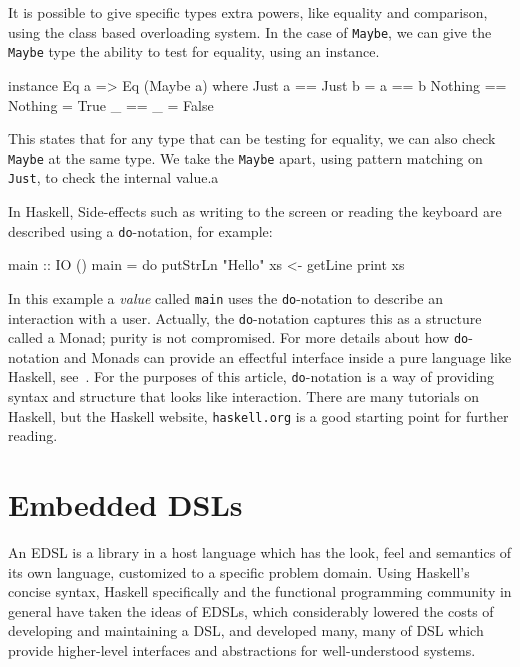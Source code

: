 \documentclass[11pt]{article}
\begin{document}
It is possible to give specific types extra powers, like equality and comparison,
using the class based overloading system. In the case of \verb|Maybe|, we
can give the \verb|Maybe| type the ability to test for equality, using an
instance.
\begin{Code}
instance Eq a => Eq (Maybe a) where        
   Just a  == Just b  = a == b
   Nothing == Nothing = True
   \_       == \_       = False
\end{Code}

This states that for any type that can be testing for equality,
we can also check \verb|Maybe| at the same type. We take the \verb|Maybe|
apart, using pattern matching on \verb|Just|, to check the internal value.a

In Haskell, Side-effects such as writing to the screen
or reading the keyboard are described using a \verb|do|-notation, for example:

\begin{Code}

main :: IO ()
main = do
  putStrLn "Hello"
  xs <- getLine
  print xs

\end{Code}

In this example a {\em value\/} called \verb|main| uses the \verb|do|-notation to describe
an interaction with a user. Actually, the \verb|do|-notation captures
this as a structure called a Monad; purity is not compromised. For more details
about how \verb|do|-notation and Monads can provide an effectful interface
inside a pure language like Haskell, see~\cite{SPJ:93:IFP}. For the
purposes of this article, \verb|do|-notation is a way of providing syntax
and structure that looks like interaction. There are many tutorials
on Haskell, but the Haskell website, \verb|haskell.org| is a good starting point
for further reading.

\section{Embedded DSLs}

An EDSL is a library in a host language which has the look, feel and semantics of its own language,
customized to a specific problem domain.
Using Haskell's concise syntax, Haskell specifically and the functional programming
community in general have taken the ideas
of EDSLs, which considerably lowered the costs of developing
and maintaining a DSL, and developed many, many of DSL 
which provide higher-level interfaces and abstractions for well-understood systems.
\end{document}
